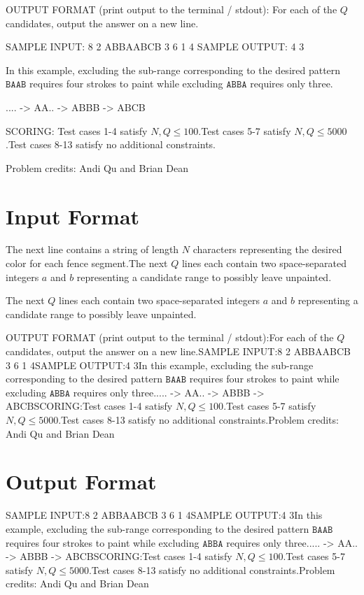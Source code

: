 \documentclass[12pt]{article}
\begin{document}
OUTPUT FORMAT (print output to the terminal / stdout):
For each of the $Q$ candidates, output the answer on a new line.

SAMPLE INPUT:
8 2
ABBAABCB
3 6
1 4
SAMPLE OUTPUT: 
4
3

In this example, excluding the sub-range corresponding to the desired pattern
$\texttt{BAAB}$ requires four strokes to paint while excluding $\texttt{ABBA}$ 
requires only three.


.... -> AA.. -> ABBB -> ABCB

SCORING:
Test cases 1-4 satisfy $N,Q\le 100$.Test cases 5-7 satisfy
$N,Q\le 5000$.Test cases 8-13 satisfy no additional constraints.


Problem credits: Andi Qu and Brian Dean



\section*{Input Format}
The next line contains a string of length $N$ characters representing the
desired color  for each fence segment.The next $Q$ lines each contain two space-separated integers $a$ and $b$
representing a candidate range to possibly leave unpainted.

The next $Q$ lines each contain two space-separated integers $a$ and $b$
representing a candidate range to possibly leave unpainted.

OUTPUT FORMAT (print output to the terminal / stdout):For each of the $Q$ candidates, output the answer on a new line.SAMPLE INPUT:8 2
ABBAABCB
3 6
1 4SAMPLE OUTPUT:4
3In this example, excluding the sub-range corresponding to the desired pattern
$\texttt{BAAB}$ requires four strokes to paint while excluding $\texttt{ABBA}$ 
requires only three..... -> AA.. -> ABBB -> ABCBSCORING:Test cases 1-4 satisfy $N,Q\le 100$.Test cases 5-7 satisfy
$N,Q\le 5000$.Test cases 8-13 satisfy no additional constraints.Problem credits: Andi Qu and Brian Dean

\section*{Output Format}
SAMPLE INPUT:8 2
ABBAABCB
3 6
1 4SAMPLE OUTPUT:4
3In this example, excluding the sub-range corresponding to the desired pattern
$\texttt{BAAB}$ requires four strokes to paint while excluding $\texttt{ABBA}$ 
requires only three..... -> AA.. -> ABBB -> ABCBSCORING:Test cases 1-4 satisfy $N,Q\le 100$.Test cases 5-7 satisfy
$N,Q\le 5000$.Test cases 8-13 satisfy no additional constraints.Problem credits: Andi Qu and Brian Dean
\end{document}
